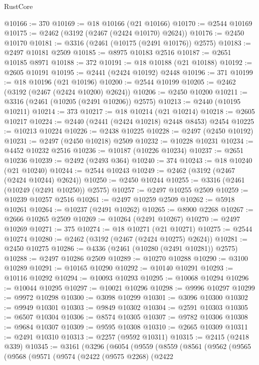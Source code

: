 \begin{lexlean}{RustCore}
\begin{coremodule}
@10166 := 370
@10169 := @18 @10166 (@21 @10166)
@10170 := @2544 @10169
@10175 := @2462 (@3192 (@2467 (@2424 @10170) @2624))
@10176 := @2450 @10170
@10181 := @3316 (@2461 (@10175 (@2491 @10176)) @2575)
@10183 := @2497 @10181 @2509
@10185 := @8975 @10183 @2516
@10187 := @2651 @10185 @8971
@10188 := 372
@10191 := @18 @10188 (@21 @10188)
@10192 := @2605 @10191
@10195 := @2441 (@2424 @10192) @2448
@10196 := 371
@10199 := @18 @10196 (@21 @10196)
@10200 := @2544 @10199
@10205 := @2462 (@3192 (@2467 (@2424 @10200) @2624))
@10206 := @2450 @10200
@10211 := @3316 (@2461 (@10205 (@2491 @10206)) @2575)
@10213 := @2440 (@10195 @10211)
@10214 := 373
@10217 := @18 @10214 (@21 @10214)
@10218 := @2605 @10217
@10224 := @2440 (@2441 (@2424 @10218) @2448 @8453) @2454
@10225 := @10213 @10224
@10226 := @2438 @10225
@10228 := @2497 (@2450 @10192)
@10231 := @2497 (@2450 @10218) @2509
@10232 := @10228 @10231
@10234 := @4452 @10232 @2516
@10236 := @10187 (@10226 @10234)
@10237 := @2651 @10236
@10239 := @2492 (@2493 @364)
@10240 := 374
@10243 := @18 @10240 (@21 @10240)
@10244 := @2544 @10243
@10249 := @2462 (@3192 (@2467 (@2424 @10244) @2624))
@10250 := @2450 @10244
@10255 := @3316 (@2461 (@10249 (@2491 @10250)) @2575)
@10257 := @2497 @10255 @2509
@10259 := @10239 @10257 @2516
@10261 := @2497 @10259 @2509
@10262 := @5918 @10261
@10264 := @10237 (@2491 @10262)
@10265 := @8900 @2268
@10267 := @2666 @10265 @2509
@10269 := @10264 (@2491 @10267)
@10270 := @2497 @10269
@10271 := 375
@10274 := @18 @10271 (@21 @10271)
@10275 := @2544 @10274
@10280 := @2462 (@3192 (@2467 (@2424 @10275) @2624))
@10281 := @2450 @10275
@10286 := @4336 (@2461 (@10280 (@2491 @10281)) @2575)
@10288 := @2497 @10286 @2509
@10289 := @10270 @10288
@10290 := @3100 @10289
@10291 := @10165 @10290
@10292 := @10140 @10291
@10293 := @10116 @10292
@10294 := @10093 @10293
@10295 := @10068 @10294
@10296 := @10044 @10295
@10297 := @10021 @10296
@10298 := @9996 @10297
@10299 := @9972 @10298
@10300 := @3098 @10299
@10301 := @3096 @10300
@10302 := @9949 @10301
@10303 := @9849 @10302
@10304 := @2591 @10303
@10305 := @6507 @10304
@10306 := @8574 @10305
@10307 := @9782 @10306
@10308 := @9684 @10307
@10309 := @9595 @10308
@10310 := @2665 @10309
@10311 := @2491 @10310
@10313 := @2257 (@9592 @10311)
@10315 := @2415 (@2418 @339)
@10345 := @3161
    (@3296
      (@6054
        (@9559
          (@8559
            (@8561
              (@9562
                (@9565
                  (@9568
                    (@9571
                      (@9574
                        (@2422
                          (@9575 @2268)
                          (@2422

\end{coremodule}
\end{lexlean}

